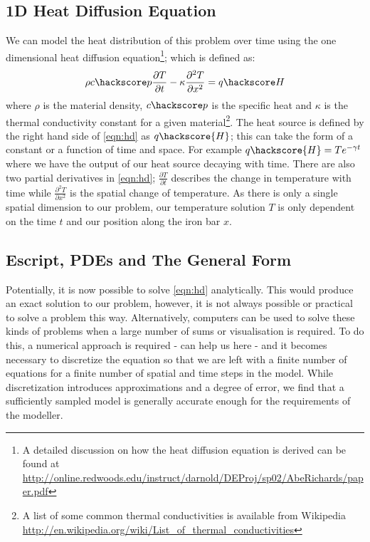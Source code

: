 \subsection{1D Heat Diffusion Equation}
We can model the heat distribution of this problem over time using the one dimensional heat diffusion equation\footnote{A detailed discussion on how the heat diffusion equation is derived can be found at \url{http://online.redwoods.edu/instruct/darnold/DEProj/sp02/AbeRichards/paper.pdf}};
which is defined as:
\begin{equation}
\rho c\hackscore p \frac{\partial T}{\partial t} - \kappa \frac{\partial^{2} T}{\partial x^{2}} = q\hackscore H 
\label{eqn:hd}
\end{equation}
where $\rho$ is the material density, $c\hackscore p$ is the specific heat and $\kappa$ is the thermal conductivity constant for a given material\footnote{A list of some common thermal conductivities is available from Wikipedia \url{http://en.wikipedia.org/wiki/List_of_thermal_conductivities}}. 
The heat source is defined by the right hand side of \ref{eqn:hd} as $q\hackscore{H}$; this can take the form of a constant or a function of time and space. For example $q\hackscore{H} = Te^{-\gamma t}$ where we have the output of our heat source decaying with time. There are also two partial derivatives in \ref{eqn:hd}; $\frac{\partial T}{\partial t}$ describes the change in temperature with time while $\frac{\partial ^2 T}{\partial x^2}$ is the spatial change of temperature. As there is only a single spatial dimension to our problem, our temperature solution $T$ is only dependent on the time $t$ and our position along the iron bar $x$.

\subsection{Escript, PDEs and The General Form}
Potentially, it is now possible to solve \ref{eqn:hd} analytically. This would produce an exact solution to our problem, however, it is not always possible or practical to solve a problem this way. Alternatively, computers can be used to solve these kinds of problems when a large number of sums or visualisation is required. To do this, a numerical approach is required - \ESCRIPT can help us here -  and it becomes necessary to discretize the equation so that we are left with a finite number of equations for a finite number of spatial and time steps in the model. While discretization introduces approximations and a degree of error, we find that a sufficiently sampled model is generally accurate enough for the requirements of the modeller.

